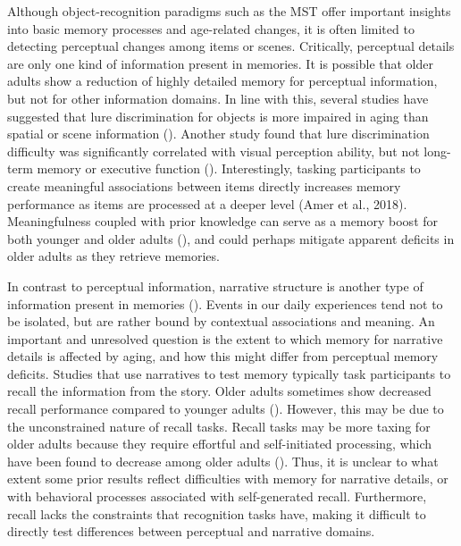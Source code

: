 \documentclass[11pt]{article}
\begin{document}
Although object-recognition paradigms such as the MST offer important insights into basic memory processes and age-related changes, it is often limited to detecting perceptual changes among items or scenes. Critically, perceptual details are only one kind of information present in memories. It is possible that older adults show a reduction of highly detailed memory for perceptual information, but not for other information domains. In line with this, several studies have suggested that lure discrimination for objects is more impaired in aging than spatial or scene information (\cite{gusten_age_2021, reagh_greater_2016, reagh_functional_2018}). Another study found that lure discrimination difficulty was significantly correlated with visual perception ability, but not long-term memory or executive function (\cite{davidson_older_2019}). Interestingly, tasking participants to create meaningful associations between items directly increases memory performance as items are processed at a deeper level (Amer et al., 2018). Meaningfulness coupled with prior knowledge can serve as a memory boost for both younger and older adults (\cite{skinner_roles_2019}), and could perhaps mitigate apparent deficits in older adults as they retrieve memories.

In contrast to perceptual information, narrative structure is another type of information present in memories (\cite{leon_architecture_2016, radvansky_novel_2005}). Events in our daily experiences tend not to be isolated, but are rather bound by contextual associations and meaning. An important and unresolved question is the extent to which memory for narrative details is affected by aging, and how this might differ from perceptual memory deficits. Studies that use narratives to test memory typically task participants to recall the information from the story. Older adults sometimes show decreased recall performance compared to younger adults (\cite{rhodes_age-related_2019}). However, this may be due to the unconstrained nature of recall tasks. Recall tasks may be more taxing for older adults because they require effortful and self-initiated processing, which have been found to decrease among older adults (\cite{rhodes_age-related_2019}). Thus, it is unclear to what extent some prior results reflect difficulties with memory for narrative details, or with behavioral processes associated with self-generated recall. Furthermore, recall lacks the constraints that recognition tasks have, making it difficult to directly test differences between perceptual and narrative domains.
\end{document}
